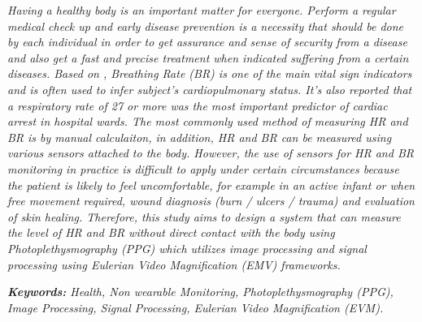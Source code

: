 \begin{abstract_en}
{

\textit{Having a healthy body is an important matter for everyone. Perform a regular medical check up and early disease prevention is a necessity that should be done by each individual in order to get assurance and sense of security from a disease and also get a fast and precise treatment when indicated suffering from a certain diseases. Based on \citet{fieselmann1993}, Breathing Rate (BR) is one of the main vital sign indicators and is often used to infer subject's cardiopulmonary status. It's also reported that a respiratory rate of 27 or more was the most important predictor of cardiac arrest in hospital wards. The most commonly used method of measuring HR and BR is by manual calculaiton, in addition, HR and BR can be measured using various sensors attached to the body. However, the use of sensors for HR and BR monitoring in practice is difficult to apply under certain circumstances because the patient is likely to feel uncomfortable, for example in an active infant  or when free movement required, wound diagnosis (burn / ulcers / trauma) and evaluation of skin healing. Therefore, this study aims to design a system that can measure the level of HR and BR without direct contact with the body using \textit{Photoplethysmography} (PPG) which utilizes image processing and signal processing using \textit{Eulerian Video Magnification} (EMV) frameworks.}

{\noindent \textit{\textbf{Keywords:} Health, Non wearable Monitoring,  \textit{Photoplethysmography} (PPG), Image Processing, Signal Processing, Eulerian Video Magnification (EVM).}}


}\end{abstract_en}

